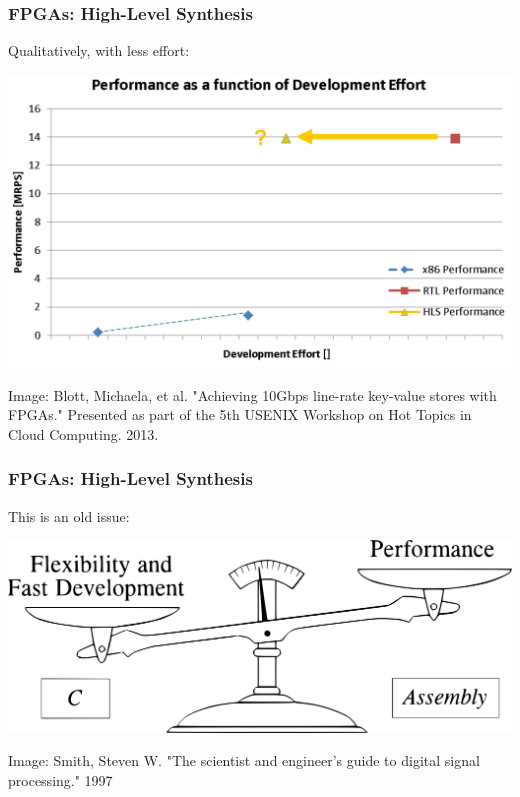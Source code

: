 \documentclass[10pt, compress, xcolor={table,xcdraw,usenames}, aspectratio=169]{beamer}
\begin{document}
\begin{frame}
    \frametitle{FPGAs: High-Level Synthesis}
    \begin{block}{\alert{Qualitatively}, with \alert{less effort}:}
    \begin{center}
        \includegraphics[width=.7\textwidth]{hls_loweffort}

        \scriptsize{Image: Blott, Michaela, et al. "Achieving 10Gbps line-rate
        key-value stores with FPGAs." Presented as part of the 5th USENIX
        Workshop on Hot Topics in Cloud Computing. 2013.}
    \end{center}
    \end{block}
\end{frame}

\begin{frame}
    \frametitle{FPGAs: High-Level Synthesis}
    \begin{block}{This is an \alert{old issue}:}
    \begin{center}
        \includegraphics[width=.74\textwidth]{tradeoff_software}

        \scriptsize{Image: Smith, Steven W. "The scientist and engineer's guide
        to digital signal processing." 1997}
    \end{center}
    \end{block}
\end{frame}
\end{document}
